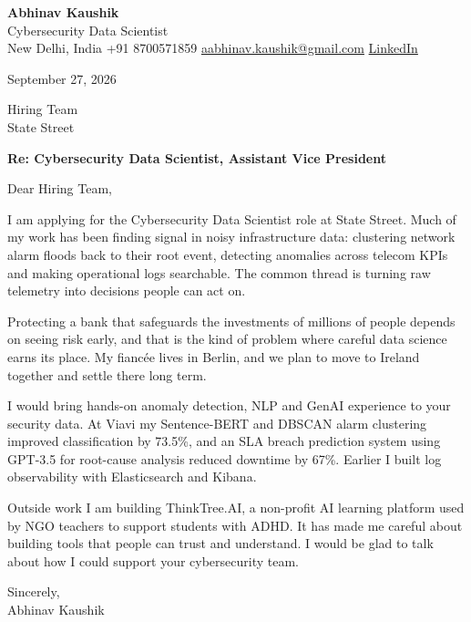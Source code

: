\documentclass[11pt,a4paper]{article}
\begin{document}
{\Large\bfseries Abhinav Kaushik}\\
Cybersecurity Data Scientist\\
New Delhi, India \textbar{} +91 8700571859 \textbar{} \href{mailto:aabhinav.kaushik@gmail.com}{aabhinav.kaushik@gmail.com} \textbar{} \href{https://www.linkedin.com/in/abhinav-kaushik10/}{LinkedIn}  

September 27, 2026

Hiring Team\\
State Street

\textbf{Re: Cybersecurity Data Scientist, Assistant Vice President}

Dear Hiring Team,

I am applying for the Cybersecurity Data Scientist role at State Street. Much of my work has been finding signal in noisy infrastructure data: clustering network alarm floods back to their root event, detecting anomalies across telecom KPIs and making operational logs searchable. The common thread is turning raw telemetry into decisions people can act on.

Protecting a bank that safeguards the investments of millions of people depends on seeing risk early, and that is the kind of problem where careful data science earns its place. My fiancée lives in Berlin, and we plan to move to Ireland together and settle there long term.

I would bring hands-on anomaly detection, NLP and GenAI experience to your security data. At Viavi my Sentence-BERT and DBSCAN alarm clustering improved classification by 73.5\%, and an SLA breach prediction system using GPT-3.5 for root-cause analysis reduced downtime by 67\%. Earlier I built log observability with Elasticsearch and Kibana.

Outside work I am building ThinkTree.AI, a non-profit AI learning platform used by NGO teachers to support students with ADHD. It has made me careful about building tools that people can trust and understand. I would be glad to talk about how I could support your cybersecurity team.

Sincerely,\\[4pt]
Abhinav Kaushik
\end{document}
